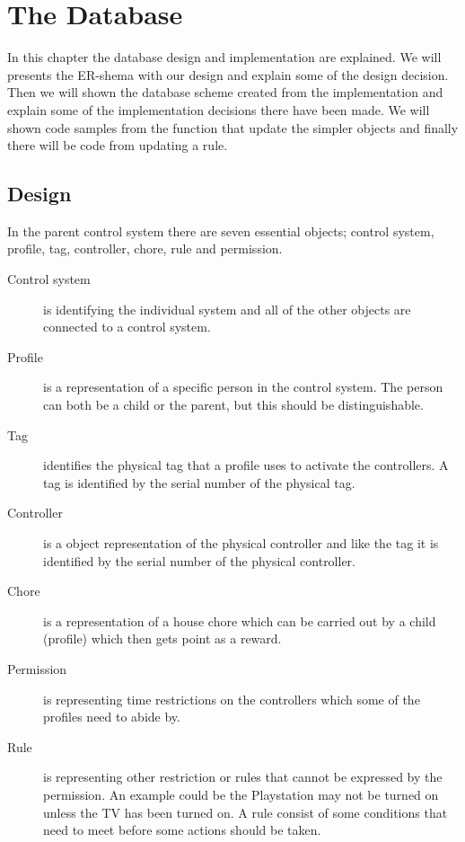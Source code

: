 \chapter{The Database}
\label{chap:database} 
In this chapter the database design and implementation are explained. We will presents the ER-shema with our design and explain some of the design decision. Then we will shown the database scheme created from the implementation and explain some of the implementation decisions there have been made. We will shown code samples from the function that update the simpler objects and finally there will be code from updating a rule.  
  
\section{Design}
\label{sec:DBdesign}
In the parent control system there are seven essential objects; control system, profile, tag, controller, chore, rule and permission. 

\begin{description}
	\item[Control system] is identifying the individual system and all of the other objects are connected to a control system.
	\item[Profile] is a representation of a specific person in the control system. The person can both be a child or the parent, but this should be distinguishable.
	\item[Tag] identifies the physical tag that a profile uses to activate the controllers. A tag is identified by the serial number of the physical tag.
	\item[Controller]	is a object representation of the physical controller and like the tag it is identified by the serial number of the physical controller.
	\item[Chore] is a representation of a house chore which can be carried out by a child (profile) which then gets point as a reward.
	\item[Permission] is representing time restrictions on the controllers which some of the profiles need to abide by. 
	\item[Rule] is representing other restriction or rules that cannot be expressed by the permission. An example could be the Playstation may not be turned on unless the TV has been turned on. A rule consist of some conditions that need to meet before some actions should be taken. 
\end{description}

